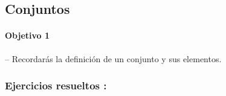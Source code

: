 \documentclass[12pt, a5paper]{article}
\begin{document}
\begin{center}
\subsection*{Conjuntos}
\end{center}

\paragraph{Objetivo 1 } -- Recordarás la definición de un conjunto y sus elementos.

\subsubsection*{Ejercicios resueltos :}
\end{document}
